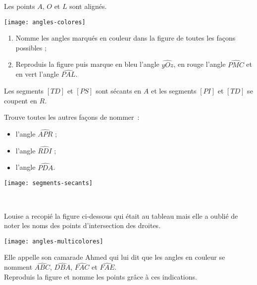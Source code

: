 \newpage






\begin{exercice}
Les points $A$, $O$ et $L$ sont alignés.
 \begin{center} \texttt{[image: angles-colores]}  \end{center}
\begin{enumerate}
 \item Nomme les angles marqués en couleur dans la figure de toutes les façons possibles ; 
 \item Reproduis la figure puis marque en bleu l'angle $\widehat{yOz}$, en rouge l'angle $\widehat{PMC}$ et en vert l'angle $\widehat{PAL}$.
 \end{enumerate}
\end{exercice}


\begin{exercice}
Les segments $[TD]$ et $[PS]$ sont sécants en $A$ et les segments $[PI]$ et $[TD]$ se coupent en $R$.

Trouve toutes les autres façons de nommer : \\[0.5em]
\begin{minipage}[c]{0.2\textwidth}
\begin{itemize}
 \item l'angle $\widehat{APR}$ ;
 \item l'angle $\widehat{RDI}$ ;
 \item l'angle $\widehat{PDA}$.
 \end{itemize}
 \end{minipage} \hfill%
  \begin{minipage}[c]{0.4\textwidth}
  \texttt{[image: segments-secants]}
  \end{minipage} \\
\end{exercice}  


\begin{exercice}
Louise a recopié la figure ci‑dessous qui était au tableau mais elle a oublié de noter les noms des points d'intersection des droites. 
 \begin{center} \texttt{[image: angles-multicolores]}  \end{center}
Elle appelle son camarade Ahmed qui lui dit que les angles en couleur se nomment $\widehat{ABC}$, $\widehat{DBA}$, $\widehat{FAC}$ et $\widehat{FAE}$. \\[0.5em]
Reproduis la figure et nomme les points grâce à ces indications.
\end{exercice}  


